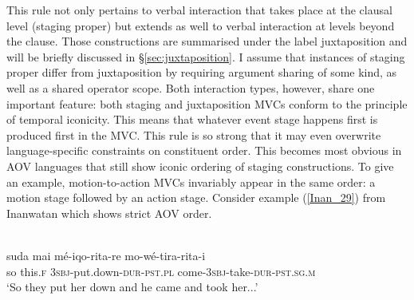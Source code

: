 This rule not only pertains to verbal interaction that takes place at the clausal level (staging proper) but extends as well to verbal interaction at levels beyond the clause. Those constructions are summarised under the label juxtaposition and will be briefly discussed in §\ref{sec:juxtaposition}. I assume that instances of staging proper differ from juxtaposition by requiring argument sharing of some kind, as well as a shared operator scope. Both interaction types, however, share one important feature: both staging and juxtaposition MVCs conform to the principle of temporal iconicity. This means that whatever event stage happens first is produced first in the MVC. This rule is so strong that it may even overwrite language-specific constraints on constituent order. This becomes most obvious in AOV languages that still show iconic ordering of staging constructions. To give an example, motion-to-action MVCs invariably appear in the same order: a motion stage followed by an action stage. Consider example (\ref{Inan_29}) from Inanwatan which shows strict AOV order.

\ea \label{Inan_29}
\\
\gll suda mai mé-iqo-rita-re mo-wé-tira-rita-i \\
so this.\textsc{f} 3\textsc{sbj}-put.down-\textsc{dur}-\textsc{pst}.\textsc{pl} come-3\textsc{sbj}-take-\textsc{dur}-\textsc{pst}.\textsc{sg}.\textsc{m} \\
\glft `So they put her down and he came and took her...' \\ 
\z

